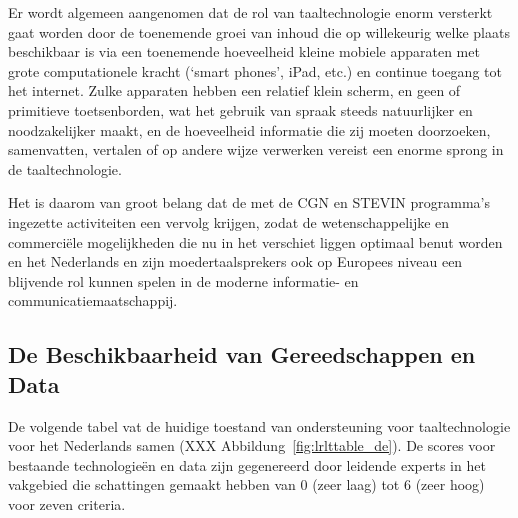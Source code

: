 \documentclass[]{../../metanetpaper}
\begin{document}
\begin{multicols}{2}
  Er wordt algemeen aangenomen dat de rol van taaltechnologie enorm versterkt gaat worden door de toenemende groei van inhoud die op willekeurig welke plaats beschikbaar is via een toenemende hoeveelheid kleine mobiele apparaten met grote computationele kracht (`smart phones', iPad, etc.) en continue toegang tot het internet. Zulke apparaten hebben een relatief klein scherm, en geen of primitieve toetsenborden, wat het gebruik van spraak steeds natuurlijker en noodzakelijker maakt, en de hoeveelheid informatie die zij moeten doorzoeken, samenvatten, vertalen of op andere wijze verwerken vereist een enorme sprong in de taaltechnologie.

  Het is daarom van groot belang dat de met de CGN en STEVIN programma's ingezette activiteiten een vervolg krijgen, zodat de wetenschappelijke en commerci{\"e}le mogelijkheden die nu in het verschiet liggen optimaal benut worden en het Nederlands en zijn moedertaalsprekers ook op Europees niveau een blijvende rol kunnen spelen in de moderne informatie- en communicatiemaatschappij.


\subsection{De Beschikbaarheid van Gereedschappen en Data}

    De volgende tabel vat de huidige toestand van ondersteuning voor taaltechnologie voor het Nederlands samen (XXX Abbildung~\ref{fig:lrlttable_de}). De scores voor bestaande technologie{\"e}n en data zijn gegenereerd door leidende experts in het vakgebied die schattingen gemaakt hebben van 0 (zeer laag) tot 6 (zeer hoog) voor zeven criteria.



\end{multicols}
\end{document}

